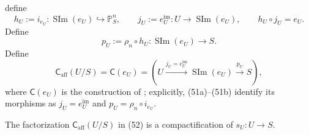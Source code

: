 \begin{definition}
  define
  \[
    h_U:=i_{e_U}\colon\operatorname{SIm}(e_U)\hookrightarrow
      \mathbb P^n_S,
    \qquad
    j_U:=e_U^{\mathrm{im}}\colon U\to\operatorname{SIm}(e_U),
    \qquad
    h_U\circ j_U=e_U.                                             \tag{51a}
  \]
  Define
  \[
    p_U:=\rho_n\circ h_U
      \colon\operatorname{SIm}(e_U)\to S.                         \tag{51b}
  \]
  Define
  \[
    \mathsf C_{\mathrm{aff}}(U/S)
      =\mathsf C(e_U)
      =
      \left(
        U\xrightarrow{j_U=e_U^{\mathrm{im}}}
        \operatorname{SIm}(e_U)
        \xrightarrow{p_U}S
      \right),                                                     \tag{52}
  \]
  where $\mathsf C(e_U)$ is the construction of
  ; explicitly,
  (51a)--(51b) identify its morphisms as
  $j_U=e_U^{\mathrm{im}}$ and $p_U=\rho_n\circ i_{e_U}$.
\end{definition}

\begin{proposition}
  \label{prop:nagata-affine-compactification}

  The factorization $\mathsf C_{\mathrm{aff}}(U/S)$ in (52) is a
  compactification of $s_U\colon U\to S$.
\end{proposition}

